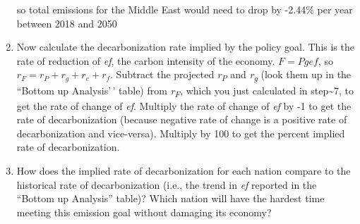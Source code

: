 \documentclass[
]{article}
\begin{document}
\begin{enumerate}
  so total emissions for the Middle East would need to drop by -2.44\%
  per year between 2018 and 2050
\item
  Now calculate the decarbonization rate implied by the policy goal.
  This is the rate of reduction of \emph{ef}, the carbon intensity of
  the economy. \(F = Pgef\), so \(r_F = r_P + r_g + r_e + r_f\).
  Subtract the projected \emph{r\textsubscript{P}} and
  \emph{r\textsubscript{g}} (look them up in the ``Bottom up
  Analysis'\,' table) from \emph{r\textsubscript{F}}, which you just
  calculated in step\textasciitilde7, to get the rate of change of
  \emph{ef}. Multiply the rate of change of \emph{ef} by -1 to get the
  rate of decarbonization (because negative rate of change is a positive
  rate of decarbonization and vice-versa). Multiply by 100 to get the
  percent implied rate of decarbonization.
\item
  How does the implied rate of decarbonization for each nation compare
  to the historical rate of decarbonization (i.e., the trend in
  \emph{ef} reported in the ``Bottom up Analysis'' table)? Which nation
  will have the hardest time meeting this emission goal without damaging
  its economy?
\end{enumerate}
\end{document}

